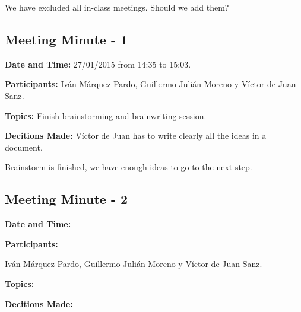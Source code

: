 \documentclass{report}
\begin{document}
We have excluded all in-class meetings. Should we add them?

\subsection{Meeting Minute - 1}


\textbf{Date and Time:} 27/01/2015 from 14:35 to 15:03.


\textbf{Participants: } Iván Márquez Pardo, Guillermo Julián Moreno y Víctor de Juan Sanz.


\textbf{Topics: }
Finish brainstorming and brainwriting session.


\textbf{Decitions Made: }
Víctor de Juan has to write clearly all the ideas in a document.

Brainstorm is finished, we have enough ideas to go to the next step.

\subsection{Meeting Minute - 2}


\textbf{Date and Time:}


\textbf{Participants: }

Iván Márquez Pardo, Guillermo Julián Moreno y Víctor de Juan Sanz.


\textbf{Topics: }


\textbf{Decitions Made: }
\end{document}
